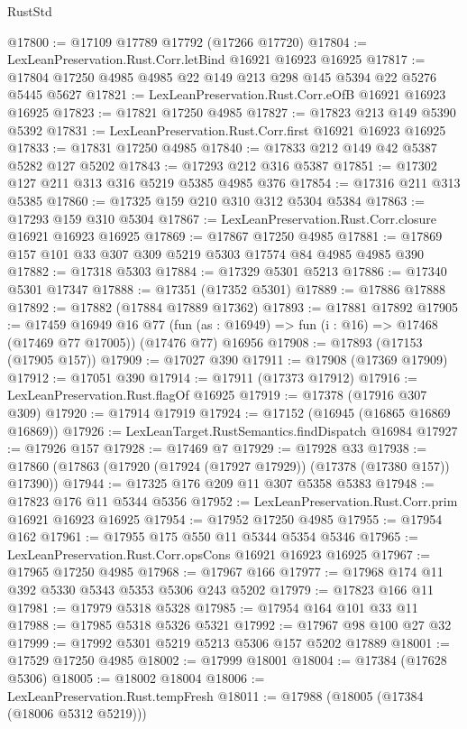 \begin{lexlean}{RustStd}
\begin{coremodule}
@17800 := @17109 @17789 @17792 (@17266 @17720)
@17804 := LexLeanPreservation.Rust.Corr.letBind @16921 @16923 @16925
@17817 := @17804 @17250 @4985 @4985 @22 @149 @213 @298 @145 @5394 @22 @5276 @5445 @5627
@17821 := LexLeanPreservation.Rust.Corr.eOfB @16921 @16923 @16925
@17823 := @17821 @17250 @4985
@17827 := @17823 @213 @149 @5390 @5392
@17831 := LexLeanPreservation.Rust.Corr.first @16921 @16923 @16925
@17833 := @17831 @17250 @4985
@17840 := @17833 @212 @149 @42 @5387 @5282 @127 @5202
@17843 := @17293 @212 @316 @5387
@17851 := @17302 @127 @211 @313 @316 @5219 @5385 @4985 @376
@17854 := @17316 @211 @313 @5385
@17860 := @17325 @159 @210 @310 @312 @5304 @5384
@17863 := @17293 @159 @310 @5304
@17867 := LexLeanPreservation.Rust.Corr.closure @16921 @16923 @16925
@17869 := @17867 @17250 @4985
@17881 := @17869 @157 @101 @33 @307 @309 @5219 @5303 @17574 @84 @4985 @4985 @390
@17882 := @17318 @5303
@17884 := @17329 @5301 @5213
@17886 := @17340 @5301 @17347
@17888 := @17351 (@17352 @5301)
@17889 := @17886 @17888
@17892 := @17882 (@17884 @17889 @17362)
@17893 := @17881 @17892
@17905 := @17459
    @16949
    @16
    @77
    (fun (as : @16949) => fun (i : @16) => @17468 (@17469 @77 @17005))
    (@17476 @77)
    @16956
@17908 := @17893 (@17153 (@17905 @157))
@17909 := @17027 @390
@17911 := @17908 (@17369 @17909)
@17912 := @17051 @390
@17914 := @17911 (@17373 @17912)
@17916 := LexLeanPreservation.Rust.flagOf @16925
@17919 := @17378 (@17916 @307 @309)
@17920 := @17914 @17919
@17924 := @17152 (@16945 (@16865 @16869 @16869))
@17926 := LexLeanTarget.RustSemantics.findDispatch @16984
@17927 := @17926 @157
@17928 := @17469 @7
@17929 := @17928 @33
@17938 := @17860 (@17863 (@17920 (@17924 (@17927 @17929)) (@17378 (@17380 @157)) @17390))
@17944 := @17325 @176 @209 @11 @307 @5358 @5383
@17948 := @17823 @176 @11 @5344 @5356
@17952 := LexLeanPreservation.Rust.Corr.prim @16921 @16923 @16925
@17954 := @17952 @17250 @4985
@17955 := @17954 @162
@17961 := @17955 @175 @550 @11 @5344 @5354 @5346
@17965 := LexLeanPreservation.Rust.Corr.opsCons @16921 @16923 @16925
@17967 := @17965 @17250 @4985
@17968 := @17967 @166
@17977 := @17968 @174 @11 @392 @5330 @5343 @5353 @5306 @243 @5202
@17979 := @17823 @166 @11
@17981 := @17979 @5318 @5328
@17985 := @17954 @164 @101 @33 @11
@17988 := @17985 @5318 @5326 @5321
@17992 := @17967 @98 @100 @27 @32
@17999 := @17992 @5301 @5219 @5213 @5306 @157 @5202 @17889
@18001 := @17529 @17250 @4985
@18002 := @17999 @18001
@18004 := @17384 (@17628 @5306)
@18005 := @18002 @18004
@18006 := LexLeanPreservation.Rust.tempFresh
@18011 := @17988 (@18005 (@17384 (@18006 @5312 @5219)))

\end{coremodule}
\end{lexlean}
